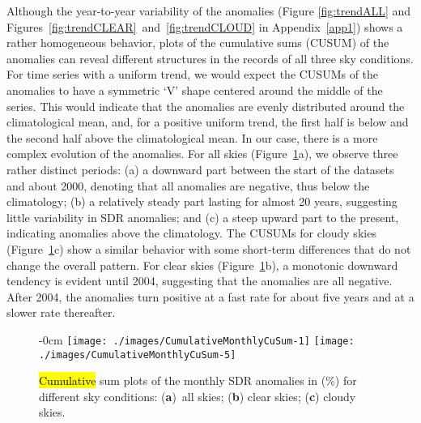 \documentclass[applsci,article,accept,moreauthors,pdftex]{Definitions/mdpi}
\begin{document}
Although the year-to-year variability of the anomalies (Figure
\ref{fig:trendALL} and \mbox{Figures~\ref{fig:trendCLEAR} and
\ref{fig:trendCLOUD}} in \mbox{Appendix \ref{app1})} shows a rather homogeneous behavior,
plots of the cumulative sums (CUSUM) \citep{Regier2019} of the anomalies
can reveal different structures in the records of all three sky
conditions. For time series with a uniform trend, we would expect the
CUSUMs of the anomalies to have a symmetric `V' shape centered around
the middle of the series. This would indicate that the anomalies are
evenly distributed around the climatological mean, and, for a positive
uniform trend, the first half is below and the second half above the
climatological mean. In our case, there is a more complex evolution of
the anomalies. For all skies (Figure~\ref{fig:cusummonth}a), we observe
three rather distinct periods: (a) a downward part between the start of
the datasets and about 2000, denoting that all anomalies are negative,
thus below the climatology; (b) a relatively steady part lasting for
almost 20 years, suggesting little variability in SDR anomalies; and (c) a
steep upward part to the present, indicating anomalies above the climatology.
The CUSUMs for cloudy skies (Figure~\ref{fig:cusummonth}c) show a
similar behavior with some short-term differences that do not change the
overall pattern. For clear skies (Figure~\ref{fig:cusummonth}b), a
monotonic downward tendency is evident until 2004, suggesting that the
anomalies are all negative. After 2004, the anomalies turn positive at
a fast rate for about five years and at a slower rate thereafter.

\begin{figure}[H]
    \begin{adjustwidth}{-\extralength}{0cm}
        {\centering 
            {\texttt{[image: ./images/CumulativeMonthlyCuSum-1]}}\hfill
            {\texttt{[image: ./images/CumulativeMonthlyCuSum-5]}}\hfill
        \hfill
        }
\end{adjustwidth}
\caption{\hl{Cumulative} %
 sum plots of the monthly SDR anomalies in (\%) for different sky conditions: (\textbf{a})~all skies; (\textbf{b}) clear skies; (\textbf{c}) cloudy skies.}\label{fig:cusummonth}

\end{figure}
\end{document}
